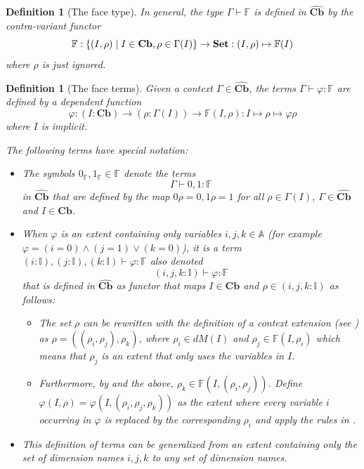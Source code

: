 \documentclass[12pt,a4paper,twoside,xetex]{book} %
\newtheorem{definition}[theorem]{Definition}
\newcommand{\psh}[1]{\widehat{#1}}
\newcommand{\cube}[0]{\textbf{Cb}}
\begin{document}
\begin{definition}[The face type]\label{facetype}
In general, the type $\Gamma \vdash \mathbb{F}$ is defined in $\psh{\cube}$ by the contra-variant functor $$\mathbb{F} : \left\{ (I, \rho) \mid  I \in 
\cube,  \rho \in \Gamma (I) \right\} \rightarrow \set: (I, \rho) \mapsto 
\mathbb{F}(I)$$ where $\rho$ is just ignored. 
\end{definition}

\begin{definition}[The face terms]
Given a context $\Gamma \in \psh{\cube}$, the terms $\Gamma \vdash \varphi : 
\mathbb{F}$ are defined by a dependent function $$\varphi : (I : \cube) 
\rightarrow (\rho : \Gamma (I)) \rightarrow  \mathbb{F}(I,\rho): I \mapsto \rho 
\mapsto \varphi \rho $$ where $I$ is implicit.

The following terms have special notation:
\begin{itemize}
 \item The symbols $ 0_{\mathbb{F}}, 
1_{\mathbb{F}} \in \mathbb{F}$ denote the terms $$\Gamma \vdash 0,1 : \mathbb{F}$$ in $\psh{\cube}$ that are defined by the map \(0 \rho = 0, 1 \rho = 1\) for all $\rho \in \Gamma (I)$, $\Gamma \in \psh{\cube}$ and $I \in \cube$.

\item When $\varphi$ is an extent containing only variables $i,j,k \in \mathbb{A}$ (for example $\varphi = (i = 0) \wedge (j = 1) \vee (k = 0)$), it is a term $(i: \mathbb{I}), (j: \mathbb{I}), (k: \mathbb{I}) \vdash 
    \varphi : \mathbb{F}$ also denoted $$(i,j,k: \mathbb{I}) \vdash \varphi : 
    \mathbb{F}$$ that is defined in  $\psh{\cube}$ as functor that maps $I \in \cube$ and  $\rho \in (i,j,k: \mathbb{I})$ as follows: 
    \begin{itemize}
    \item  The set $\rho$ can be rewritten with the definition of a context extension (see ) as $\rho = ((\rho_i, \rho_j), \rho_k)$, where $\rho_i \in dM(I)$ and $\rho_j \in \mathbb{F}(I,\rho_i)$ which means that $\rho_j$ is an extent that only uses the     variables in $I$. 
    \item Furthermore, by  and the above, $\rho_k \in \mathbb{F}(I, (\rho_i, \rho_j))$. Define $\varphi(I,\rho)=\varphi(I,(\rho_i,\rho_j,\rho_k))$ as 
    the extent where every variable $i$ occurring in $\varphi$ is replaced by the 
    corresponding $\rho_i$ and apply the rules in .
    \end{itemize}
\item This definition of terms can be generalized from an extent containing only the set of dimension names $i,j,k$ to any set of dimension names.
\end{itemize}
\end{definition}
\end{document}
